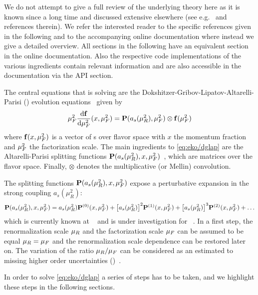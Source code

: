 We do not attempt to give a full review of the underlying theory
here as it is known since a long time and discussed extensive elsewhere
(see e.g.\ \cite{Peskin:1995ev,Ellis:1996mzs} and references therein).
We refer the interested reader to the specific references given in the following and to
the accompanying online documentation where instead we give a detailed
overview. All sections in the following have an equivalent section in
the online documentation. Also the respective code implementations of the
various ingredients contain relevant information and are also accessible
in the documentation via the API section.

The central equations that \eko{} is solving are the
Dokshitzer-Gribov-Lipatov-Altarelli-Parisi (\dglap) evolution
equations~\cite{Altarelli:1977zs,Gribov:1972ri,Dokshitzer:1977sg} given by
\begin{equation}
    \muF^2 \dv{\vb f}{\muF^2}{}(x,\muF^2) = \vb P (a_s(\muR^2),\muF^2) \otimes \vb f(\muF^2)
    \label{eq:eko/dglap}
\end{equation}
where $\vb f(x,\mu_F^2)$ is a vector of \pdf{}s over flavor space with $x$ the
momentum fraction and $\mu_F^2$ the factorization scale.
The main ingredients to \cref{eq:eko/dglap} are the Altarelli-Parisi splitting
functions $\vb P(a_s(\mu_R^2),x,\mu_F^2)$~\cite{Moch:2004pa,Vogt:2004mw}, which
are matrices over the flavor space.
Finally, $\otimes$ denotes the multiplicative (or Mellin) convolution.

The splitting functions $\vb P(a_s(\mu_R^2),x,\mu_F^2)$ expose a perturbative
expansion in the strong coupling $a_s(\mu_R^2)$:
\begin{equation}
    \vb P(a_s(\mu_R^2),x,\mu_F^2) = a_s(\mu_R^2) \vb P^{(0)}(x,\mu_F^2)
    + \qty[a_s(\mu_R^2)]^2 \vb P^{(1)}(x,\mu_F^2)
    + \qty[a_s(\mu_R^2)]^3 \vb P^{(2)}(x,\mu_F^2)
    + \ldots
\end{equation}
which is currently known at \nnlo{}~\cite{Moch:2004pa,Vogt:2004mw,Blumlein:2021enk} and is under
investigation for \nnnlo{}~\cite{Moch:2021qrk}.
In a first step, the renormalization scale $\mu_R$ and the factorization scale
$\mu_F$ can be assumed to be equal $\mu_R = \mu_F$ and the renormalization scale
dependence can be restored later on. The variation of the ratio $\mu_R/\mu_F$ can
be considered as an estimated to missing higher order
uncertainties (\mhou{})~\cite{AbdulKhalek:2019ihb}.

In order to solve \cref{eq:eko/dglap} a series of steps has to be taken, and we
highlight these steps in the following sections.

